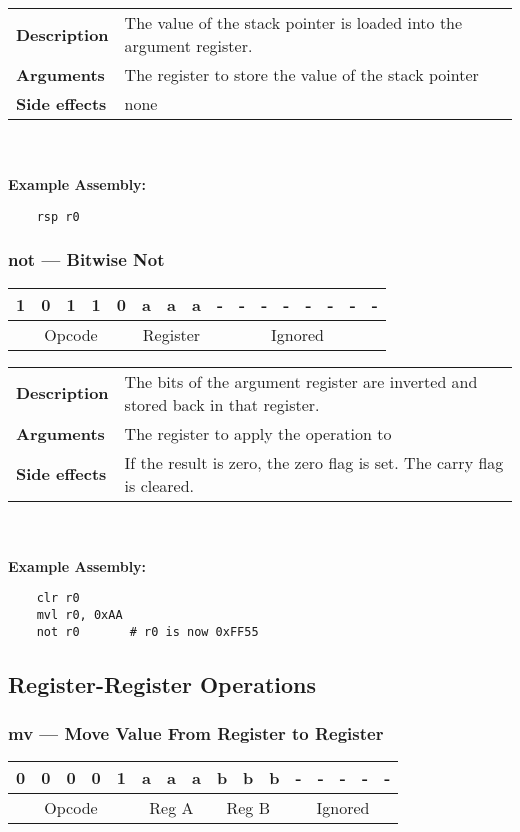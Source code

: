 \documentclass[titlepage]{article}
\begin{document}
\begin{tabular}{l p{8cm}}
{\bf Description} & The value of the stack pointer is loaded into the argument register. \\
{\bf Arguments} & The register to store the value of the stack pointer \\
{\bf Side effects} & none \\
\end{tabular}\\ \\
{\bf Example Assembly:}
\begin{verbatim}
    rsp r0
\end{verbatim}

\subsubsection{not --- Bitwise Not}\begin{center}
\begin{tabular}{|c|c|c|c|c|c|c|c|c|c|c|c|c|c|c|c|}
\hline
1 & 0 & 1 & 1 & 0 & a & a & a & - & - & - & - & - & - & - & - \\
\hline
\multicolumn{5}{|c}{Opcode} &
\multicolumn{3}{|c}{Register} &
\multicolumn{8}{|c|}{Ignored} \\
\hline
\end{tabular}
\end{center}

\begin{tabular}{l p{8cm}}
{\bf Description} & The bits of the argument register are inverted and stored back in that register. \\
{\bf Arguments} & The register to apply the operation to \\
{\bf Side effects} & If the result is zero, the zero flag is set. The carry flag is cleared. \\
\end{tabular}\\ \\
{\bf Example Assembly:}
\begin{verbatim}
    clr r0
    mvl r0, 0xAA
    not r0       # r0 is now 0xFF55
\end{verbatim}

\subsection{Register-Register Operations}

\subsubsection{mv --- Move Value From Register to Register}\begin{center}
\begin{tabular}{|c|c|c|c|c|c|c|c|c|c|c|c|c|c|c|c|}
\hline
0 & 0 & 0 & 0 & 1 & a & a & a & b & b & b & - & - & - & - & - \\
\hline
\multicolumn{5}{|c}{Opcode} &
\multicolumn{3}{|c}{Reg A} &
\multicolumn{3}{|c}{Reg B} &
\multicolumn{5}{|c|}{Ignored} \\
\hline
\end{tabular}
\end{center}
\end{document}
